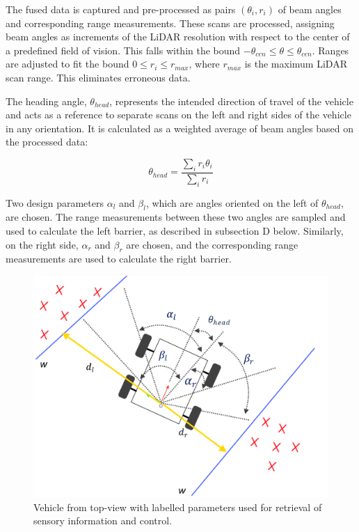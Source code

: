 \documentclass[conference]{IEEEtran}
\begin{document}
The fused data is captured and pre-processed as pairs $(\theta_i, r_i)$ of beam angles and corresponding range measurements. These scans are processed, assigning beam angles as increments of the LiDAR resolution with respect to the center of a predefined field of vision. This falls within the bound $-\theta_{cen} \leq \theta \leq \theta_{cen}$.  Ranges are adjusted to fit the bound $0 \leq r_i \leq r_{max}$, where $r_{max}$ is the maximum LiDAR scan range. This eliminates erroneous data.

The heading angle, $\theta_{head}$, represents the intended direction of travel of the vehicle and acts as a reference to separate scans on the left and right sides of the vehicle in any orientation. It is calculated as a weighted average of beam angles based on the processed data:

\[\theta_{head} = \frac{\sum_{i} r_i \theta_i}{\sum_{i} r_i} \]

Two design parameters $\alpha_l$ and $\beta_l$, which are angles oriented on the left of $\theta_{head}$, are chosen.  The range measurements between these two angles are sampled and used to calculate the left barrier, as described in subsection D below. Similarly, on the right side, $\alpha_r$ and $\beta_r$ are chosen, and the corresponding range measurements are used to calculate the right barrier. 


\begin{figure}[h!]
    \centering
    \includegraphics[scale=0.2]{diagram.png}
    \caption{Vehicle from top-view with labelled parameters used for retrieval of sensory information and control.}
    \label{Figure 3}
\end{figure}
\end{document}
